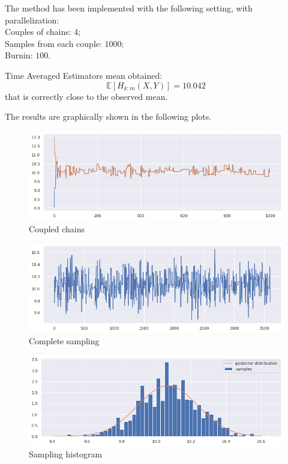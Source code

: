 \documentclass[11pt,a4paper,oneside]{report}
\begin{document}
The method has been implemented with the following setting, with parallelization:\\
Couples of chains: $4$;\\
Samples from each couple: $1000$;\\
Burnin: $100$.


Time Averaged Estimators mean obtained:
$$ 
	\mathbb{E}[H_{k:m}(X,Y)] = 10.042
$$
that is correctly close to the observed mean.
		
The results are graphically shown in the following plots.

	\begin{figure}[h!]
		\centering
		\includegraphics[width=\textwidth]{immagini_coupling/2_catene_coupling}	
		\caption{Coupled chains}
		\label{coupl1}
	\end{figure}

	\begin{figure}[h!]
		\centering
		\includegraphics[width=\textwidth]{immagini_coupling/traceplot_coupling}
		\caption{Complete sampling}
		\label{coupl2}
	\end{figure}

	\begin{figure}[h!]
		\centering
		\includegraphics[width=\textwidth]{immagini_coupling/hist_coupling}
		\caption{Sampling histogram}
		\label{coupl3}
	\end{figure}
\end{document}
